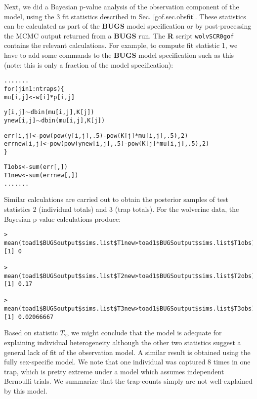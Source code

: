 Next, we did a Bayesian p-value analysis of the observation component
of the model, using the 3 fit statistics
described
in Sec. \ref{gof.sec.obsfit}.
These statistics can be calculated as part of
the {\bf BUGS} model specification or by post-processing the MCMC
output returned from a {\bf BUGS} run.
The {\bf R} script \mbox{\tt wolvSCR0gof} contains the relevant
calculations.  For example, to compute fit statistic 1, we have to add
some commands to the {\bf
  BUGS} model specification such as this (note: this is only a
fraction of the model specification):
\begin{alltt}
.......
for(j in 1:ntraps)\{
 mu[i,j] <- w[i]*p[i,j]

 y[i,j] \(\sim\) dbin(mu[i,j],K[j])
ynew[i,j] \(\sim\) dbin(mu[i,j],K[j])

err[i,j] <-  pow(pow(y[i,j],.5) - pow(K[j]*mu[i,j],.5),2)
errnew[i,j] <- pow(pow(ynew[i,j],.5) - pow(K[j]*mu[i,j],.5),2)
\}

T1obs <- sum(err[,])
T1new <- sum(errnew[,])
.......
\end{alltt}
Similar calculations are carried out to obtain the posterior samples
of test statistics 2 (individual totals) and 3 (trap totals). For the
wolverine data, the Bayesian p-value calculations produce:
{\small
\begin{verbatim}
> mean(toad1$BUGSoutput$sims.list$T1new>toad1$BUGSoutput$sims.list$T1obs)
[1] 0

> mean(toad1$BUGSoutput$sims.list$T2new>toad1$BUGSoutput$sims.list$T2obs)
[1] 0.17

> mean(toad1$BUGSoutput$sims.list$T3new>toad1$BUGSoutput$sims.list$T3obs)
[1] 0.02066667
\end{verbatim}
}
Based on statistic  $T_2$, we might conclude that the model
is adequate for explaining individual heterogeneity although the other
two statistics 
 suggest a general lack of fit of the observation model.
A similar result is obtained using the fully sex-specific
model.
We 
note that one individual was captured 8 times in one trap, which is
pretty extreme under a model which assumes independent Bernoulli
trials. We summarize that the trap-counts simply are not
well-explained by this model.

\begin{comment}
This produces:
\begin{verbatim}
fully sex-specific model:
>  mean(toad4$BUGSoutput$sims.list$T1new>toad4$BUGSoutput$sims.list$T1obs)
[1] 0
>  mean(toad4$BUGSoutput$sims.list$T2new>toad4$BUGSoutput$sims.list$T2obs)
[1] 0.234
>  mean(toad4$BUGSoutput$sims.list$T3new>toad4$BUGSoutput$sims.list$T3obs)
[1] 0.02133333
\end{verbatim}
which doesn't improve fit very much at all.
\end{comment}


